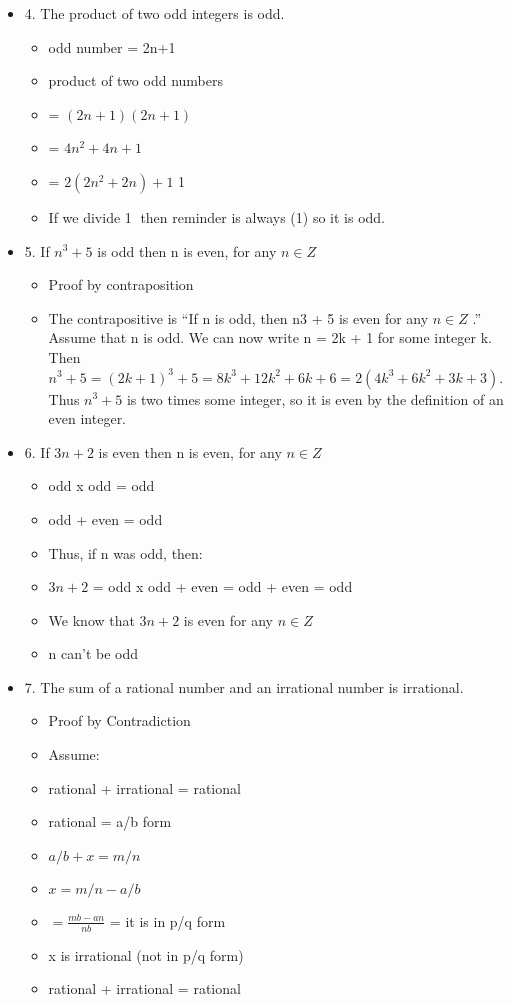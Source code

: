 \documentclass[11pt]{article}
\begin{document}
\begin{itemize}
\item 4. The product of two odd integers is odd.
\begin{itemize}
\item odd number = 2n+1
\item product of two odd numbers
\item = $(2n+1)(2n+1)$
\item = $4n^2 + 4n + 1$
\item = $2(2n^2 +2n) +1$ \textcircled{1}
\item If we divide \textcircled{1} then reminder is always (1) so it is odd.
\end{itemize} 


\item 5. If  $ n^3 +5 $ is odd then n is even, for any $n \in Z$
\begin{itemize}
\item Proof by contraposition
\item The contrapositive is “If n is odd, then n3 + 5 is even for any $n \in Z$ .” Assume that n is odd. We can now write n = 2k + 1 for some integer k. Then $n^{3} + 5 = (2k + 1)^{3} + 5 = 8k^{3} + 12k^{2} + 6k + 6 = 2(4k^{3} + 6k^{2} + 3k + 3)$. Thus $n^{3} + 5$ is two times some integer, so it is even by the definition of an even integer.
\end{itemize} 

\item 6. If $3n +2$ is even then n is even, for any $n \in Z$
\begin{itemize}
\item odd x odd = odd
\item odd + even = odd
\item Thus, if n was odd, then:
\item $3n+2$ = odd x odd + even = odd + even = odd
\item We know that $3n +2$ is even for any $n \in Z$
\item n can't be odd
\end{itemize} 


\item 7. The sum of a rational number and an irrational number is irrational.
\begin{itemize}
\item Proof by Contradiction
\item Assume:
\item rational + irrational = rational 
\item rational = a/b form 
\item $a/b + x = m/n$
\item $x = m/n - a/b$
\item $= \frac{mb - an}{nb}$ = it is in p/q form 
\item x is irrational (not in p/q form)
\item rational + irrational = rational 
\end{itemize} 



\end{itemize}
\end{document}
